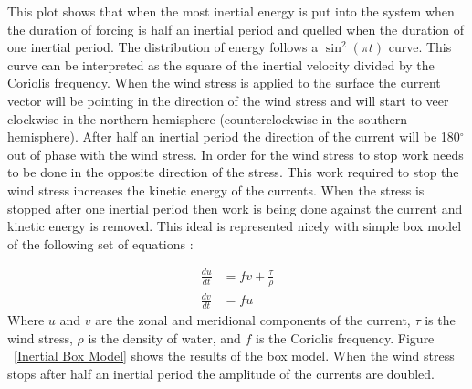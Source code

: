 This plot shows that when the most inertial energy is put into the system when the duration of forcing is half an inertial period and quelled when the duration of one inertial period. 
The distribution of energy follows a $\sin^2(\pi t)$ curve. This curve can be interpreted as the square of the inertial velocity divided by the  Coriolis frequency. 
When the wind stress is applied to the surface the current vector will be pointing in the direction of the wind stress and  
will start to veer clockwise in the northern hemisphere (counterclockwise in the southern hemisphere). After half an inertial period the direction
of the current will be 180$^{\circ}$ out of phase with the wind stress. In order for the wind stress to stop work needs to be done in the opposite direction
of the stress. This work required to stop the wind stress increases the kinetic energy of the currents. When the stress 
is stopped after one inertial period then work is being done against the current and kinetic energy is removed. 
This ideal is represented nicely with simple box model of the following set of equations : 

\begin{align}
	\frac{du}{dt} &= fv+\frac{\tau}{\rho}\\
	\frac{dv}{dt} &= fu
\end{align}
Where $u$ and $v$ are the zonal and meridional components of the current, $\tau$ is the wind stress, $\rho$ is the density of water, and $f$ is the Coriolis frequency. 
Figure  ~\ref{Inertial Box Model} shows the results of the box model. When the wind stress stops after half an inertial period the amplitude of the currents are doubled. 


